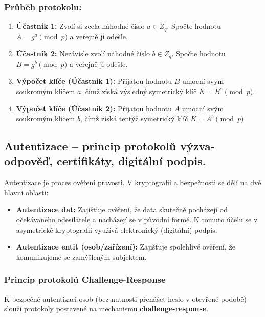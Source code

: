                     \subsubsection*{Průběh protokolu:}
                        \begin{enumerate}
                            \item \textbf{Účastník 1:} Zvolí si zcela náhodné číslo $a \in {Z}_q$. Spočte hodnotu $A = g^a \pmod{p}$ a veřejně ji odešle.
                            \item \textbf{Účastník 2:} Nezávisle zvolí náhodné číslo $b \in {Z}_q$. Spočte hodnotu $B = g^b \pmod{p}$ a veřejně ji odešle.
                            \item \textbf{Výpočet klíče (Účastník 1):} Přijatou hodnotu $B$ umocní svým soukromým klíčem $a$, čímž získá výsledný symetrický klíč $K = B^a \pmod{p}$.
                            \item \textbf{Výpočet klíče (Účastník 2):} Přijatou hodnotu $A$ umocní svým soukromým klíčem $b$, čímž získá tentýž symetrický klíč $K = A^b \pmod{p}$. 
                        \end{enumerate}
                    
            \subsection{Autentizace – princip protokolů výzva-odpověď, certifikáty, digitální podpis.}
                Autentizace je proces ověření pravosti. V kryptografii a bezpečnosti se dělí na dvě hlavní oblasti:

                \begin{itemize}
                    \item \textbf{Autentizace dat:} Zajišťuje ověření, že data skutečně pocházejí od očekávaného odesílatele a nacházejí se v původní formě. K tomuto účelu se v asymetrické kryptografii využívá elektronický (digitální) podpis.
                    \item \textbf{Autentizace entit (osob/zařízení):} Zajišťuje spolehlivé ověření, že komunikujeme se zamýšleným subjektem.
                \end{itemize}

                \subsubsection{Princip protokolů Challenge-Response}
                     K bezpečné autentizaci osob (bez nutnosti přenášet heslo v otevřené podobě) slouží protokoly postavené na mechanismu \textbf{challenge-response}.
                    
